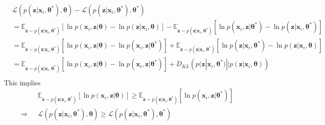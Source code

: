 \documentclass[a4]{article}
\begin{document}
\begin{equation}
\begin{aligned}
    &\mathcal{L}( p(\mathbf{z} | \mathbf{x}_i,\bm{\theta^*} ), \bm{\theta}) 
-
     \mathcal{L}( p(\mathbf{z} | \mathbf{x}_i,\bm{\theta^*} ), \bm{\theta^*} )\\
& =
      \mathbb{E}_{ \mathbf{z} \sim p( \mathbf{z} | \mathbf{x}_i, \bm{\theta^*} ) }\left[
          \ln p( \mathbf{x}_i,\mathbf{z} | \bm{\theta} ) 
        - \ln p( \mathbf{z} | \mathbf{x}_i, \bm{\theta})
      \right] 
    - \mathbb{E}_{ \mathbf{z} \sim p( \mathbf{z} | \mathbf{x}_i, \bm{\theta^*} ) }\left[
          \ln p( \mathbf{x}_i, \mathbf{z} | \bm{\theta^*} )
        - \ln p( \mathbf{z} | \mathbf{x}_i, \bm{\theta^*} )
      \right]\label{eqbase}\\
& =
      \mathbb{E}_{ \mathbf{z} \sim p( \mathbf{z} | \mathbf{x}_i, \bm{\theta^*} ) }\left[
          \ln p( \mathbf{x}_i, \mathbf{z} | \bm{\theta}) 
        - \ln p( \mathbf{x}_i, \mathbf{z} | \bm{\theta^*}) 
      \right] 
    + \mathbb{E}_{ \mathbf{z} \sim p( \mathbf{z} | \mathbf{x}_i, \bm{\theta^*}) }\left[
          \ln p( \mathbf{z} | \mathbf{x}_i, \bm{\theta^*} )
        - \ln p( \mathbf{z} | \mathbf{x}_i, \bm{\theta} )
      \right]\\
& =
      \mathbb{E}_{ \mathbf{z} \sim p( \mathbf{z} | \mathbf{x}_i, \bm{\theta^*} ) }\left[
          \ln p( \mathbf{x}_i, \mathbf{z} | \bm{\theta} )
        - \ln p( \mathbf{x}_i, \mathbf{z} | \bm{\theta^*})
      \right]
    + D_{KL}\left(    p( \mathbf{z} | \mathbf{x}_i, \bm{\theta^*} ) 
                   || p( \mathbf{z} | \mathbf{x}_i, \bm{\theta}   )\right)\\
\end{aligned}
\end{equation}
This implies 
\begin{equation}
\begin{aligned}
      &\mathbb{E}_{ \mathbf{z} \sim p( \mathbf{z} | \mathbf{x}_i,\bm{\theta^*} ) }\left[
          \ln p( \mathbf{x}_i, \mathbf{z} | \bm{\theta})
      \right]
    \ge
       \mathbb{E}_{ \mathbf{z} \sim p( \mathbf{z} | \mathbf{x}_i, \bm{\theta^*} ) }\left[
          \ln p( \mathbf{x}_i, \mathbf{z} | \bm{\theta^*})
      \right] \\
\Rightarrow\:\:\: &
      \mathcal{L}( p( \mathbf{z} | \mathbf{x}_i, \bm{\theta^*} ), \bm{\theta} )
    \ge
      \mathcal{L}( p( \mathbf{z} | \mathbf{x}_i, \bm{\theta^*} ), \bm{\theta^*} )
\end{aligned}
\end{equation}
\end{document}
